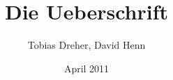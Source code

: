 
\title{Die Ueberschrift}
\author{Tobias Dreher, David Henn}
\date{April 2011}

 


	\twocolumn[
		\maketitle
		\renewcommand{\abstractname}{}
		\begin{onecolabstract}
			
		\end{onecolabstract}
		\vspace{1cm}
	]
	
		
		
	
	
	\onecolumn
	
	


